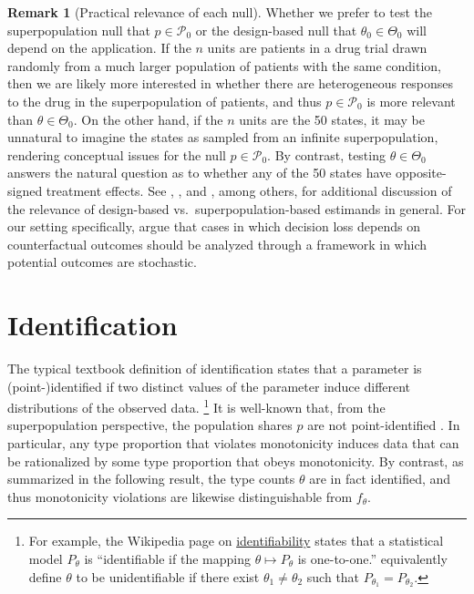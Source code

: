 \documentclass[12pt,reqno]{amsart}
\theoremstyle{theorem}
\theoremstyle{definition}
\newtheorem{rem}{Remark}
\newcommand{\0}{\mathbf{0}}
\newcommand{\1}{\mathbf{1}}
\begin{document}
\begin{rem}[Practical relevance of each null]
Whether we prefer to test the superpopulation null that $p \in \mathcal{P}_0$ or the
design-based null that $\theta_0 \in \Theta_0$ will depend on the application. If the $n$
units are patients in a drug trial drawn randomly from a much larger population of
patients with the same condition, then we are likely more interested in whether there are heterogeneous responses to the drug in the superpopulation of patients, and thus $p \in
\mathcal{P}_0$ is more relevant than $\theta \in \Theta_0$. On the other hand, if the $n$
units are the 50 states, it may be unnatural to imagine the states as sampled from an
infinite superpopulation, rendering conceptual issues for the null $p \in \mathcal{P}_0$.
By contrast, testing $\theta \in \Theta_0$ answers the natural question as to whether any
of the 50 states have opposite-signed treatment effects. See \citet{copas_randomization_1973},
\citet{reichardt_justifying_1999}, and \citet{rambachan_design-based_2025}, among others,
for additional discussion of the relevance of design-based vs.\ superpopulation-based
estimands in general.
For our setting specifically, \cite{gelman2025russian} argue that cases in which decision loss depends on counterfactual outcomes should be analyzed through a framework in which potential outcomes are stochastic.


\end{rem}




\section{Identification}

The typical textbook definition of identification states that a parameter is \mbox{(point-)}\allowbreak{}identified if two
distinct values of the parameter induce different distributions of the observed data.%
\footnote{For example, the Wikipedia page on \href{https://en.wikipedia.org/w/index.php?title=Identifiability&oldid=1292274414}{identifiability} states that a statistical model $P_\theta$ is ``identifiable if the mapping $\theta \mapsto P_\theta$ is one-to-one.'' \citet[][Definition 5.2]{lehmann_theory_1998} equivalently define $\theta$ to be unidentifiable if there exist $\theta_1 \neq \theta_2$ such that $P_{\theta_1} = P_{\theta_2}$.}
It
is well-known that, from the superpopulation perspective, the population shares $p$ are not
point-identified \citep{heckman_making_1997}. In particular, any type proportion that
violates monotonicity induces data that can be rationalized by some  type proportion
that obeys monotonicity. By contrast, as summarized in the following result, the type
counts $\theta$ are in fact identified, and thus monotonicity violations are likewise
distinguishable from $f_\theta$.
\end{document}
